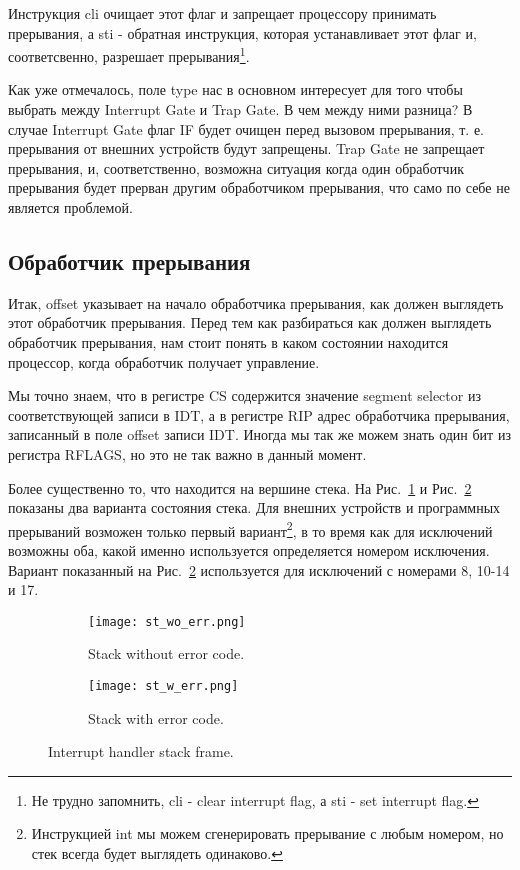 Инструкция cli очищает этот флаг и запрещает процессору принимать прерывания,
а sti - обратная инструкция, которая устанавливает этот флаг и, соответсвенно,
разрешает прерывания\footnote{Не трудно запомнить, cli - clear interrupt flag,
а sti - set interrupt flag.}.

Как уже отмечалось, поле type нас в основном интересует для того чтобы выбрать
между Interrupt Gate и Trap Gate. В чем между ними разница? В случае Interrupt
Gate флаг IF будет очищен перед вызовом прерывания, т. е. прерывания от внешних
устройств будут запрещены. Trap Gate не запрещает прерывания, и, соответственно,
возможна ситуация когда один обработчик прерывания будет прерван другим
обработчиком прерывания, что само по себе не является проблемой.

\subsection{Обработчик прерывания}

Итак, offset указывает на начало обработчика прерывания, как должен выглядеть
этот обработчик прерывания. Перед тем как разбираться как должен выглядеть
обработчик прерывания, нам стоит понять в каком состоянии находится процессор,
когда обработчик получает управление.

Мы точно знаем, что в регистре CS содержится значение segment selector из
соответствующей записи в IDT, а в регистре RIP адрес обработчика прерывания,
записанный в поле offset записи IDT. Иногда мы так же можем знать один бит из
регистра RFLAGS, но это не так важно в данный момент.

Более существенно то, что находится на вершине стека. На
Рис.~\ref{fig:st_wo_err} и Рис.~\ref{fig:st_w_err} показаны два варианта
состояния стека. Для внешних устройств и программных прерываний возможен только
первый вариант\footnote{Инструкцией int мы можем сгенерировать прерывание с
любым номером, но стек всегда будет выглядеть одинаково.}, в то время как для
исключений возможны оба, какой именно используется определяется номером
исключения. Вариант показанный на Рис.~\ref{fig:st_w_err} используется для
исключений с номерами 8, 10-14 и 17.

\begin{figure}
  \centering
  \begin{subfigure}{0.4\textwidth}
    \texttt{[image: st\_wo\_err.png]}
    \caption{Stack without error code.}
    \label{fig:st_wo_err}
  \end{subfigure}
  \begin{subfigure}{0.4\textwidth}
    \texttt{[image: st\_w\_err.png]}
    \caption{Stack with error code.}
    \label{fig:st_w_err}
  \end{subfigure}
  \caption{Interrupt handler stack frame.}
  \label{fig:st_frame}
\end{figure}

